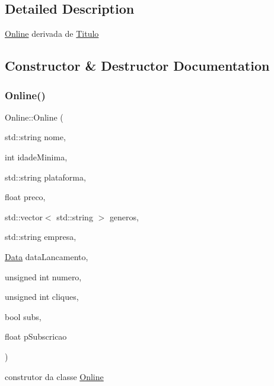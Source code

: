 \subsection{Detailed Description}
\hyperlink{classOnline}{Online} derivada de \hyperlink{classTitulo}{Titulo} 

\subsection{Constructor \& Destructor Documentation}
\mbox{\label{classOnline_ae6a934ef34ed86ab205190f2b632366a}} 
\subsubsection{\texorpdfstring{Online()}{Online()}}
{\footnotesize\ttfamily Online\+::\+Online (\begin{DoxyParamCaption}\item[{std\+::string}]{nome,  }\item[{int}]{idade\+Minima,  }\item[{std\+::string}]{plataforma,  }\item[{float}]{preco,  }\item[{std\+::vector$<$ std\+::string $>$}]{generos,  }\item[{std\+::string}]{empresa,  }\item[{\hyperlink{classData}{Data}}]{data\+Lancamento,  }\item[{unsigned int}]{numero,  }\item[{unsigned int}]{cliques,  }\item[{bool}]{subs,  }\item[{float}]{p\+Subscricao }\end{DoxyParamCaption})}



construtor da classe \hyperlink{classOnline}{Online} 


